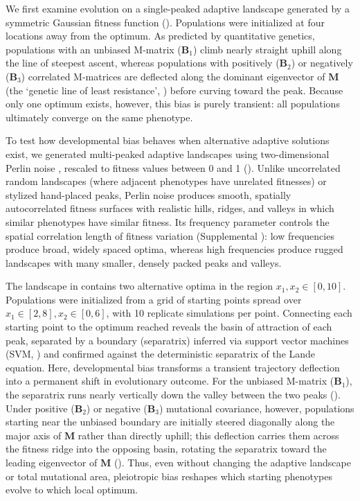 We first examine evolution on a single-peaked adaptive landscape generated by a symmetric Gaussian fitness function ().
Populations were initialized at four locations away from the optimum.
As predicted by quantitative genetics, populations with an unbiased M-matrix ($\mathbf{B}_1$) climb nearly straight uphill along the line of steepest ascent, whereas populations with positively ($\mathbf{B}_2$) or negatively ($\mathbf{B}_3$) correlated M-matrices are deflected along the dominant eigenvector of $\mathbf{M}$ (the `genetic line of least resistance', \cite{Schluter1996-uo}) before curving toward the peak.
Because only one optimum exists, however, this bias is purely transient: all populations ultimately converge on the same phenotype.

To test how developmental bias behaves when alternative adaptive solutions exist, we generated multi-peaked adaptive landscapes using two-dimensional Perlin noise \parencite{perlin1985image}, rescaled to fitness values between 0 and 1 ().
Unlike uncorrelated random landscapes (where adjacent phenotypes have unrelated fitnesses) or stylized hand-placed peaks, Perlin noise produces smooth, spatially autocorrelated fitness surfaces with realistic hills, ridges, and valleys in which similar phenotypes have similar fitness.
Its frequency parameter controls the spatial correlation length of fitness variation (Supplemental ): low frequencies produce broad, widely spaced optima, whereas high frequencies produce rugged landscapes with many smaller, densely packed peaks and valleys.

The landscape in  contains two alternative optima in the region $x_1, x_2 \in [0, 10]$.
Populations were initialized from a grid of starting points spread over $x_1 \in [2, 8], x_2 \in [0, 6]$, with 10 replicate simulations per point.
Connecting each starting point to the optimum reached reveals the basin of attraction of each peak, separated by a boundary (separatrix) inferred via support vector machines (SVM, ) and confirmed against the deterministic separatrix of the Lande equation.
Here, developmental bias transforms a transient trajectory deflection into a permanent shift in evolutionary outcome.
For the unbiased M-matrix ($\mathbf{B}_1$), the separatrix runs nearly vertically down the valley between the two peaks ().
Under positive ($\mathbf{B}_2$) or negative ($\mathbf{B}_3$) mutational covariance, however, populations starting near the unbiased boundary are initially steered diagonally along the major axis of $\mathbf{M}$ rather than directly uphill; this deflection carries them across the fitness ridge into the opposing basin, rotating the separatrix toward the leading eigenvector of $\mathbf{M}$ ().
Thus, even without changing the adaptive landscape or total mutational area, pleiotropic bias reshapes which starting phenotypes evolve to which local optimum.

